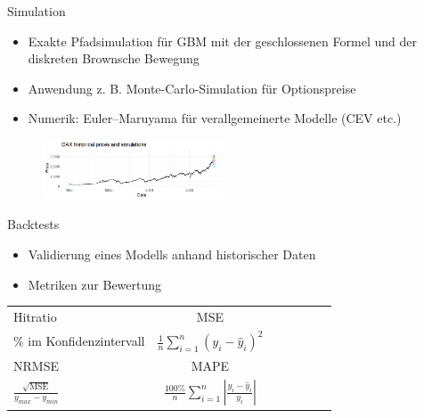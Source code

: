 \documentclass{beamer}
\begin{document}
\begin{frame}{Simulation}
  \begin{itemize}
      \item Exakte Pfadsimulation für GBM mit der geschlossenen Formel und der diskreten Brownsche Bewegung
      \item Anwendung z. B. Monte-Carlo-Simulation für Optionspreise
      \item Numerik: Euler--Maruyama für verallgemeinerte Modelle (CEV etc.)
  \end{itemize}
  \begin{figure}
    \centering
  \includegraphics[width=0.48\textwidth]{../thesis/images/dax_monte_carlo.png}
  \end{figure}
\end{frame}

\begin{frame}{Backtests}
  \begin{itemize}
      \item Validierung eines Modells anhand historischer Daten
      \item Metriken zur Bewertung
  
  \end{itemize}
\begin{table}[H]
\centering
\begin{tabular}{lcccccc}
Hitratio & MSE \\

\% im Konfidenzintervall & $\frac{1}{n} \sum_{i=1}^n (y_i - \hat{y}_i)^2$  \\
\hline
NRMSE & MAPE \\
$\frac{\sqrt{\text{MSE}}}{y_{max} - y_{min}}$ & $\frac{100\%}{n} \sum_{i=1}^n \left|\frac{y_i - \hat{y}_i}{y_i}\right|$ \\

\end{tabular}
\end{table}

\end{frame}
\end{document}

